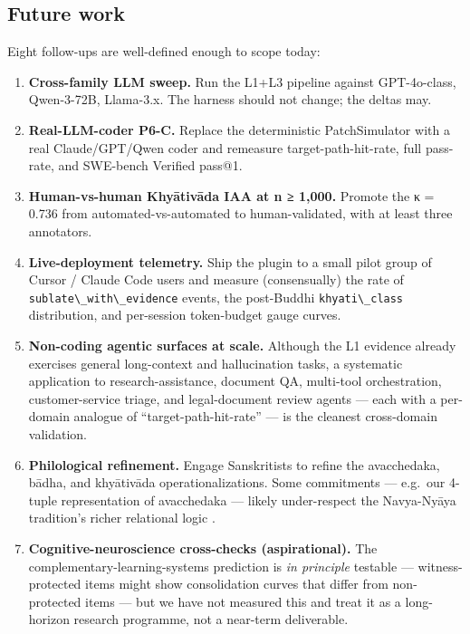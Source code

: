 \subsection{Future work}\label{future-work}

Eight follow-ups are well-defined enough to scope today:

\begin{enumerate}
\def\labelenumi{\arabic{enumi}.}
\item
  \textbf{Cross-family LLM sweep.} Run the L1+L3 pipeline against GPT-4o-class, Qwen-3-72B, Llama-3.x. The harness should not change; the deltas may.
\item
  \textbf{Real-LLM-coder P6-C.} Replace the deterministic PatchSimulator with a real Claude/GPT/Qwen coder and remeasure target-path-hit-rate, full pass-rate, and SWE-bench Verified pass@1.
\item
  \textbf{Human-vs-human Khyātivāda IAA at n ≥ 1,000.} Promote the κ = 0.736 from automated-vs-automated to human-validated, with at least three annotators.
\item
  \textbf{Live-deployment telemetry.} Ship the plugin to a small pilot group of Cursor / Claude Code users and measure (consensually) the rate of \passthrough{\lstinline!sublate\_with\_evidence!} events, the post-Buddhi \passthrough{\lstinline!khyati\_class!} distribution, and per-session token-budget gauge curves.
\item
  \textbf{Non-coding agentic surfaces at scale.} Although the L1 evidence already exercises general long-context and hallucination tasks, a systematic application to research-assistance, document QA, multi-tool orchestration, customer-service triage, and legal-document review agents --- each with a per-domain analogue of ``target-path-hit-rate'' --- is the cleanest cross-domain validation.
\item
  \textbf{Philological refinement.} Engage Sanskritists to refine the avacchedaka, bādha, and khyātivāda operationalizations. Some commitments --- e.g.~our 4-tuple representation of avacchedaka --- likely under-respect the Navya-Nyāya tradition's richer relational logic \citep{matilal1968navyanyaya, ingalls1951materials, gangesa14tattvacintamani}.
\item
  \textbf{Cognitive-neuroscience cross-checks (aspirational).} The complementary-learning-systems prediction \citep{mcclelland1995cls, kumaran2016cls} is \emph{in principle} testable --- witness-protected items might show consolidation curves that differ from non-protected items --- but we have not measured this and treat it as a long-horizon research programme, not a near-term deliverable.

\end{enumerate}
